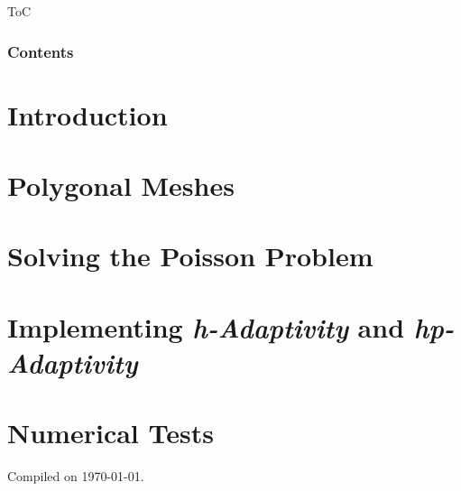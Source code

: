 \documentclass[10pt]{beamer}
\title{\presentationtitle}
\subtitle{Advanced Programming for Scientific Computing}
\author[Andrea Di Antonio]{Andrea Di Antonio \\ Supervised by Professors Paola F. Antonietti and Marco Verani} %
\date{Exam session of September 10, 2024 \\ Academic Year 2023-24}
\begin{document}
    \begin{frame}
        \titlepage
    \end{frame} %

	\begin{frame}{ToC}
		\frametitle{Contents}
		\tableofcontents[hideallsubsections]
	\end{frame}

    \section{Introduction}
    

	\section{Polygonal Meshes}
	

	\section{Solving the Poisson Problem}
	

	\section{Implementing \textit{h-Adaptivity} and \textit{hp-Adaptivity}}
	

	\section{Numerical Tests}
	

	\begin{frame}[allowframebreaks]
		\nocite{*}
		\printbibliography
	\end{frame}

	\begin{frame}
		\thispagestyle{empty}
		\begin{center}
			Compiled on \today.
		\end{center}
	\end{frame}
\end{document}
